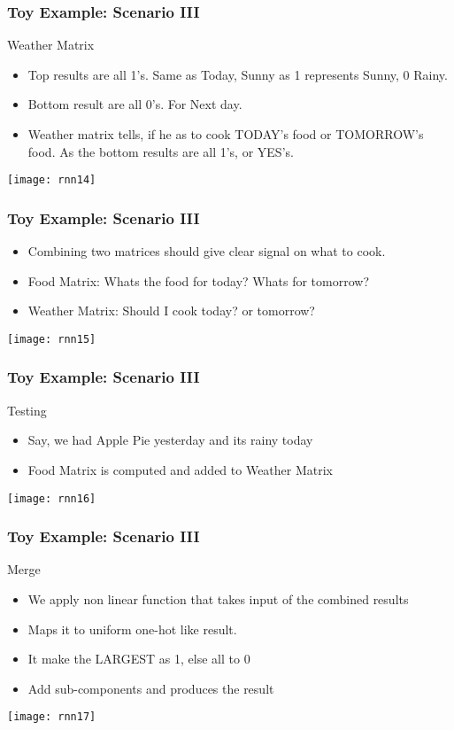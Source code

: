 \begin{frame}[fragile] \frametitle{Toy Example: Scenario III}
Weather Matrix
\begin{itemize}
\item Top results are all 1's. Same as Today, Sunny as 1 represents Sunny, 0 Rainy.
\item Bottom result are all 0's. For Next day.
\item Weather matrix tells, if he as to cook TODAY's food or TOMORROW's food. As the bottom results are all 1's, or YES's.
\end{itemize}
\begin{center}
\texttt{[image: rnn14]}
\end{center}
\end{frame}

\begin{frame}[fragile] \frametitle{Toy Example: Scenario III}
\begin{itemize}
\item Combining two matrices should give clear signal on what to cook.
\item Food Matrix: Whats the food for today? Whats for tomorrow?
\item Weather Matrix: Should I cook today? or tomorrow?
\end{itemize}
\begin{center}
\texttt{[image: rnn15]}
\end{center}
\end{frame}


\begin{frame}[fragile] \frametitle{Toy Example: Scenario III}
Testing
\begin{itemize}
\item Say, we had Apple Pie yesterday and its rainy today
\item Food Matrix is computed and added to Weather Matrix
\end{itemize}
\begin{center}
\texttt{[image: rnn16]}
\end{center}
\end{frame}

\begin{frame}[fragile] \frametitle{Toy Example: Scenario III}
Merge
\begin{itemize}
\item We apply non linear function that takes input of the combined results
\item Maps it to uniform one-hot like result.
\item It make the LARGEST as 1, else all to 0
\item Add sub-components  and produces the result
\end{itemize}
\begin{center}
\texttt{[image: rnn17]}
\end{center}
\end{frame}

